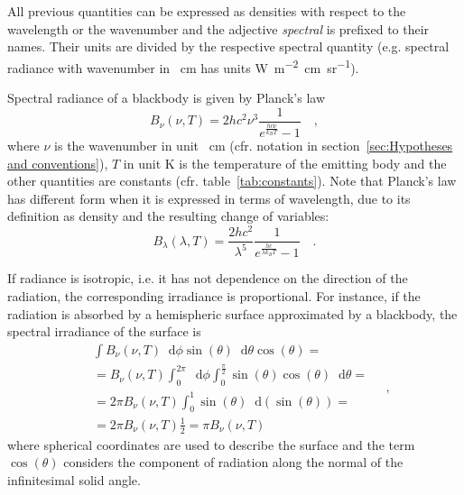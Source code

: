 \documentclass[a4paper,10pt,final,twocolumn]{article}
\newcommand{\dd}{\mathop{}\!\mathrm{d}}
\begin{document}

All previous quantities can be expressed as densities with respect to the wavelength or the wavenumber and the adjective \emph{spectral} is prefixed to their names. Their units are divided by the respective spectral quantity (e.g. spectral radiance with wavenumber in \unit{\per\centi\metre} has units \unit{\watt\per\metre\squared\centi\metre\per\steradian}).

Spectral radiance of a blackbody is given by Planck's law
\begin{equation}
  \label{eq:blackbody_spectral_radiance}
  B_\nu (\nu, T) = 2 h c^2 \nu^3 \frac{1}{e^\frac{h c \nu}{k_B T} - 1}
  \quad ,
\end{equation}
where $\nu$ is the wavenumber in unit \unit{\per\centi\metre} (cfr. notation in section~\ref{sec:Hypotheses and conventions}), $T$ in unit \unit{\kelvin} is the temperature of the emitting body and the other quantities are constants (cfr. table~\ref{tab:constants}).
Note that Planck's law has different form when it is expressed in terms of wavelength, due to its definition as density and the resulting change of variables:
\begin{equation}
  \label{eq:blackbody_spectral_radiance_lambda}
  B_\lambda (\lambda, T) = \frac{2 h c^2}{\lambda^5} \frac{1}{e^\frac{h c}{\lambda k_B T} - 1}
  \quad .
\end{equation}

If radiance is isotropic, i.e. it has not dependence on the direction of the radiation, the corresponding irradiance is proportional. For instance, if the radiation is absorbed by a hemispheric surface approximated by a blackbody, the spectral irradiance of the surface is
\begin{equation}
  \label{eq:blackbody_spectral_irradiance_hemisphere}
  \begin{split}
    & \int B_\nu (\nu, T) \dd \phi \sin(\theta) \dd \theta \cos(\theta) = \\
    & = B_\nu (\nu, T) \int_0^{2\pi} \dd \phi \int_0^\frac{\pi}{2} \sin(\theta) \cos(\theta) \dd \theta = \\
    & = 2 \pi B_\nu (\nu, T) \int_0^1 \sin(\theta) \dd(\sin(\theta)) = \\
    & = 2 \pi B_\nu (\nu, T) \frac{1}{2} = \pi B_\nu (\nu, T)
  \end{split}
  \quad ,
\end{equation}
where spherical coordinates are used to describe the surface and the term $\cos(\theta)$ considers the component of radiation along the normal of the infinitesimal solid angle.



\newpage
\printbibliography[heading=bibintoc]
\end{document}
